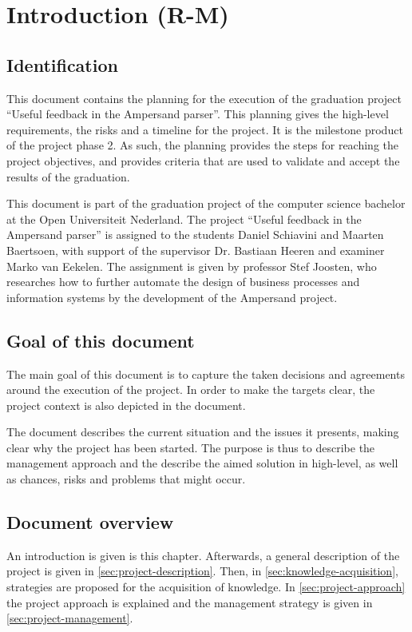 \section{Introduction (R-M)}
\subsection{Identification}
%
This document contains the planning for the execution of the graduation project ``Useful feedback in the Ampersand parser''.
This planning gives the high-level requirements, the risks and a timeline for the project.
It is the milestone product of the project phase 2.
As such, the planning provides the steps for reaching the project objectives, and provides criteria that are used to validate and accept the results of the graduation.

This document is part of the graduation project of the computer science bachelor at the Open Universiteit Nederland.
The project ``Useful feedback in the Ampersand parser'' is assigned to the students Daniel Schiavini and Maarten Baertsoen, with support of the supervisor Dr. Bastiaan Heeren and examiner Marko van Eekelen.
The assignment is given by professor Stef Joosten, who researches how to further automate the design of business processes and information systems by the development of the Ampersand project.

\subsection{Goal of this document}
The main goal of this document is to capture the taken decisions and agreements around the execution of the project.
In order to make the targets clear, the project context is also depicted in the document.

The document describes the current situation and the issues it presents, making clear why the project has been started.
The purpose is thus to describe the management approach and the describe the aimed solution in high-level, as well as chances, risks and problems that might occur.

\subsection{Document overview}
An introduction is given is this chapter.
Afterwards, a general description of the project is given in \autoref{sec:project-description}.
Then, in \autoref{sec:knowledge-acquisition}, strategies are proposed for the acquisition of knowledge.
In \autoref{sec:project-approach} the project approach is explained and the management strategy is given in \autoref{sec:project-management}.

